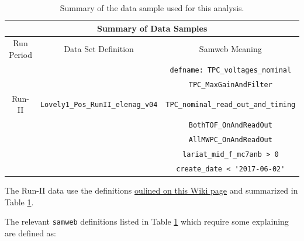 \begin{center}
\begin{table}[b]
	\begin{center}
	\begin{tabular}{|c|c|c|}
	\multicolumn{3}{c}{\textbf{Summary of Data Samples}} \\
	\hline \hline
	 Run Period & Data Set Definition & Samweb Meaning \\
     \hline	
	&  & \verb!defname: TPC_voltages_nominal! \\
	\hline
	 &  & \verb!TPC_MaxGainAndFilter! \\
	\hline
	Run-II & \verb!Lovely1_Pos_RunII_elenag_v04! & \verb!TPC_nominal_read_out_and_timing!  \\
	\hline
	 & & \verb!BothTOF_OnAndReadOut!  \\
	\hline
	 & & \verb!AllMWPC_OnAndReadOut!  \\
	 \hline
	 & & \verb!lariat_mid_f_mc7anb > 0! \\
	 	 \hline
	 & & \verb!create_date < '2017-06-02'! \\

	 \hline
	\end{tabular}%
	\caption{Summary of the data sample used for this analysis. }
	\label{tab:datasamples}
	\end{center}
\end{table}
\end{center}

The Run-II data use the definitions \href{https://redmine.fnal.gov/redmine/projects/lardbt/wiki/Recommended_SAM_Datasets}{oulined on this Wiki page} and summarized in Table \ref{tab:datasamples}.


The relevant \texttt{samweb} definitions listed in Table \ref{tab:datasamples} which require some explaining are defined as:

